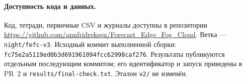 \paragraph{Доступность кода и данных.} Код, тетради, первичные CSV и журналы доступны в репозитории \url{https://github.com/annfridreksen/Forecast_Edge_Fog_Cloud}. Ветка --- \texttt{night/fefc-v3}. Исходный коммит выполненной сборки: \texttt{fc75e2a5119ed0b3d691961094fcc62998caf276}. Результаты публикуются отдельным последующим коммитом; его идентификатор и запуск приведены в PR~2 и \texttt{results/final-check.txt}. Эталон \texttt{v2/} не изменён.
